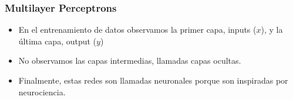 \documentclass[
  shownotes,
  xcolor={svgnames},
  hyperref={colorlinks,citecolor=DarkBlue,linkcolor=DarkRed,urlcolor=DarkBlue}
  , aspectratio=169]{beamer}
\begin{document}
\begin{frame}
\frametitle{Multilayer Perceptrons}

\begin{itemize}

\item En el entrenamiento de datos observamos la primer capa, inputs ($x$), y la última capa, output ($y$)
\medskip
\item No observamos las capas intermedias, llamadas capas ocultas.
\medskip
\item Finalmente, estas redes son llamadas neuronales porque son inspiradas por
neurociencia.



\end{itemize}
\end{frame}

\end{document}
